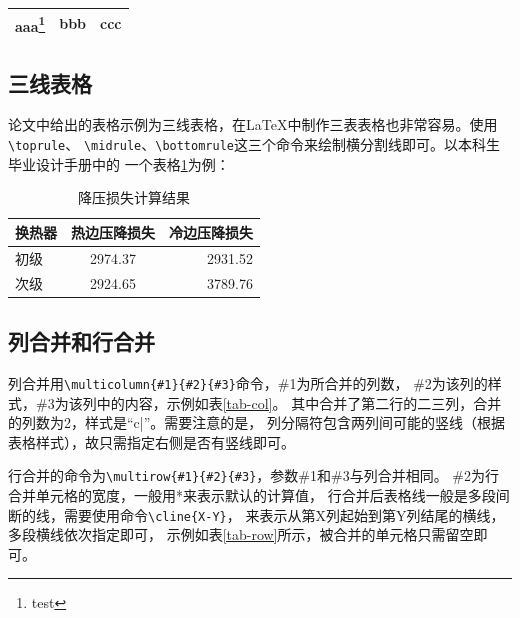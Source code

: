 				\begin{minipage}[h]{\textwidth}
					\begin{tabular}{|c|c|c|}
						\hline
						aaa\footnote{test} & bbb & ccc \\
						\hline
					\end{tabular}
				\end{minipage}
				
				\subsection{三线表格}
				\label{three-line-table}
				
				论文中给出的表格示例为三线表格，在\LaTeX{}中制作三表表格也非常容易。使用\verb|\toprule|、
				\verb|\midrule|、\verb|\bottomrule|这三个命令来绘制横分割线即可。以本科生毕业设计手册中的
				一个表格\ref{tab-three-line-table-example}为例：
				
				\begin{table}
					\centering
					\caption{降压损失计算结果}
					\label{tab-three-line-table-example}
					\begin{tabular}{lcr}
						\toprule
						换热器 & 热边压降损失 & 冷边压降损失 \\
						\midrule
						初级   & 2974.37      & 2931.52      \\
						次级   & 2924.65      & 3789.76      \\
						\bottomrule
					\end{tabular}
				\end{table}
				
				\subsection{列合并和行合并}
				\label{subsec-tab-col-row}
				列合并用\verb|\multicolumn{#1}{#2}{#3}|命令，\#1为所合并的列数，
				\#2为该列的样式，\#3为该列中的内容，示例如表\ref{tab-col}。
				其中合并了第二行的二三列，合并的列数为2，样式是“c|”。需要注意的是，
				列分隔符包含两列间可能的竖线（根据表格样式），故只需指定右侧是否有竖线即可。
				
				行合并的命令为\verb|\multirow{#1}{#2}{#3}|，参数\#1和\#3与列合并相同。
				\#2为行合并单元格的宽度，一般用*来表示默认的计算值，
				行合并后表格线一般是多段间断的线，需要使用命令\verb|\cline{X-Y}|，
				来表示从第X列起始到第Y列结尾的横线，多段横线依次指定即可，
				示例如表\ref{tab-row}所示，被合并的单元格只需留空即可。
				
